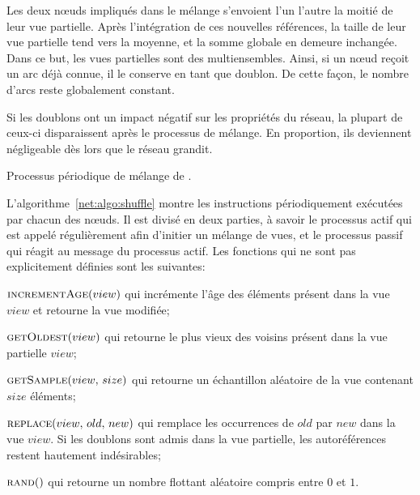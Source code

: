 Les deux nœuds impliqués dans le mélange s'envoient l'un l'autre la moitié de
leur vue partielle. Après l'intégration de ces nouvelles références, la taille
de leur vue partielle tend vers la moyenne, et la somme globale en demeure
inchangée. Dans ce but, les vues partielles sont des multiensembles. Ainsi, si
un nœud reçoit un arc déjà connue, il le conserve en tant que doublon.  De cette
façon, le nombre d'arcs reste globalement constant.

Si les doublons ont un impact négatif sur les propriétés du réseau, la plupart
de ceux-ci disparaissent après le processus de mélange. En proportion, ils
deviennent négligeable dès lors que le réseau grandit.

\begin{algorithm}[h]
  
  \caption[Processus périodique de mélange de \SPRAY]
  {\label{net:algo:shuffle}Processus périodique de mélange de \SPRAY.}
\end{algorithm}

L'algorithme~\ref{net:algo:shuffle} montre les instructions périodiquement
exécutées par chacun des nœuds. Il est divisé en deux parties, à savoir le
processus actif qui est appelé régulièrement afin d'initier un mélange de vues,
et le processus passif qui réagit au message du processus actif. Les fonctions
qui ne sont pas explicitement définies sont les suivantes:
\begin{inparaenum}[]
\item $\textsc{incrementAge}(view)$ qui incrémente l'âge des éléments présent
  dans la vue $view$ et retourne la vue modifiée;
\item $\textsc{getOldest}(view)$ qui retourne le plus vieux des voisins présent
  dans la vue partielle $view$;
\item $\textsc{getSample}(view,\, size)$ qui retourne un échantillon aléatoire
  de la vue contenant $size$ éléments;
\item $\textsc{replace}(view,\,old,\,new)$ qui remplace les occurrences de $old$
  par $new$ dans la vue $view$. Si les doublons sont admis dans la vue
  partielle, les autoréférences restent hautement indésirables;
\item $\textsc{rand}()$ qui retourne un nombre flottant aléatoire compris entre
  $0$ et $1$.
\end{inparaenum}

